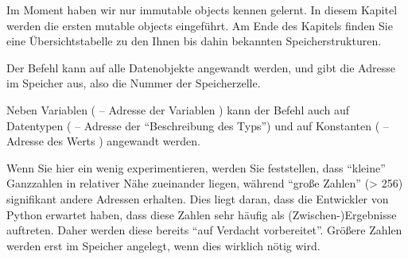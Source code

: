 Im Moment haben wir nur immutable objects kennen gelernt. In diesem Kapitel werden die ersten mutable objects eingeführt. Am Ende des Kapitels finden Sie eine Übersichtstabelle zu den Ihnen bis dahin bekannten Speicherstrukturen.

\begin{hintbox}
Der Befehl  kann auf alle Datenobjekte angewandt werden, und gibt die Adresse im Speicher aus, also die Nummer der Speicherzelle.

Neben Variablen ( -- Adresse der Variablen ) kann der Befehl auch auf Datentypen ( -- Adresse der \enquote{Beschreibung des Typs}) und auf Konstanten ( -- Adresse des Werts ) angewandt werden.

Wenn Sie hier ein wenig experimentieren, werden Sie feststellen, dass \enquote{kleine} Ganzzahlen in relativer Nähe zueinander liegen, während \enquote{große Zahlen} (> 256) signifikant andere Adressen erhalten. Dies liegt daran, dass die Entwickler von Python erwartet haben, dass diese Zahlen sehr häufig als (Zwischen-)Ergebnisse auftreten. Daher werden diese bereits \enquote{auf Verdacht vorbereitet}. Größere Zahlen werden erst im Speicher angelegt, wenn dies wirklich nötig wird.
\end{hintbox}

